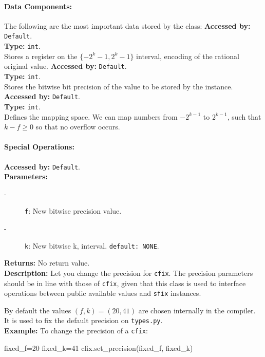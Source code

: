 	\paragraph{Data Components:}
	The following are the most important data stored by the class:
	\textbf{Accessed by:} \verb|Default|.\\
	\textbf{Type:} \verb|int|.\\
	Stores a register on the $\{-2^k-1, 2^k-1\}$ interval, encoding of the rational original value.
	\textbf{Accessed by:} \verb|Default|.\\
	\textbf{Type:} \verb|int|.\\
	Stores the bitwise bit precision of the value to be stored by the instance.
	\textbf{Accessed by:} \verb|Default|.\\
	\textbf{Type:} \verb|int|.\\
	Defines the mapping space. We can map numbers  from $-2^{k-1}$ to $2^{k-1}$, such that $k-f \geq 0$ so that no overflow occurs.
	
	
	\paragraph {Special Operations:}

			\textbf{Accessed by:} \verb|Default|.\\
    		\textbf{Parameters:}
     		\begin{description}
	     		\item[-] \verb|f|: New bitwise precision value.
	    		\item[-] \verb|k|: New bitwise k, interval. \verb|default: NONE|.
    		\end{description}
    		\textbf{Returns:} No return value. \\
     		\textbf{Description:}
				Let you change the precision for \verb|cfix|. The precision parameters should be in line with those of \verb|cfix|, given that this class is used to interface operations between public available values and \verb|sfix| instances.
        
                                By default the values $(f,k)=(20,41)$ are chosen internally in the compiler.
                                It is used to fix the default precision on \verb|types.py|. \\
			\textbf{Example:}
				To change the precision of a \verb|cfix|:
     			\begin{mylisting}
     			fixed_f=20
     			fixed_k=41
     			cfix.set_precision(fixed_f, fixed_k)
     			\end{mylisting}
     			
